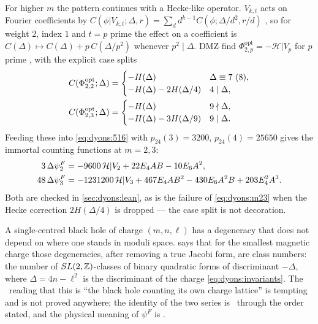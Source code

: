 For higher $m$ the pattern continues with a Hecke-like operator. $V_{k,t}$ acts on Fourier
coefficients by $C(\phi|V_{k,t};\Delta,r)=\sum_{d}d^{k-1}C(\phi;\Delta/d^2,r/d)$
, so for weight $2$, index $1$ and $t=p$ prime the effect on a
coefficient is $C(\Delta)\mapsto C(\Delta)+p\,C(\Delta/p^2)$ whenever $p^2\mid\Delta$. DMZ find
$\Phi^{\mathrm{opt}}_{2,p}=-\mathcal H|V_p$ for $p$ prime ,
with the explicit case splits
\begin{align}\label{eq:dyons:V2V3}
  C(\Phi^{\mathrm{opt}}_{2,2};\Delta)&=
  \begin{cases}-H(\Delta)&\Delta\equiv7\ (8),\\ -H(\Delta)-2H(\Delta/4)&4\mid\Delta,\end{cases}\notag\\
  C(\Phi^{\mathrm{opt}}_{2,3};\Delta)&=
  \begin{cases}-H(\Delta)&9\nmid\Delta,\\ -H(\Delta)-3H(\Delta/9)&9\mid\Delta.\end{cases}
\end{align}
Feeding these into \eqref{eq:dyons:516} with $p_{24}(3)=3200$, $p_{24}(4)=25650$ gives the
immortal counting functions at $m=2,3$:
\begin{align}\label{eq:dyons:m23}
  3\,\Delta\psi^F_2&=-9600\,\mathcal H|V_2+22E_4AB-10E_6A^2,\notag\\
  48\,\Delta\psi^F_3&=-1231200\,\mathcal H|V_3+467E_4AB^2-430E_6A^2B+203E_4^2A^3 .
\end{align}
Both are checked in \cref{sec:dyons:lean}, as is the failure of \eqref{eq:dyons:m23} when the
Hecke correction $2H(\Delta/4)$ is dropped --- the case split is not decoration.

\begin{physicsbox}
A single-centred black hole of charge $(m,n,\ell)$ has a degeneracy that does not depend on
where one stands in moduli space.  says that for the smallest magnetic
charge those degeneracies, after removing a true Jacobi form, are class numbers: the number of
$SL(2,\mathbb{Z})$-classes of binary quadratic forms of discriminant $-\Delta$, where $\Delta=4n-\ell^2$ is
the discriminant of the charge \eqref{eq:dyons:invariants}. The \TC\ reading that this is
``the black hole counting its own charge lattice'' is tempting and is not proved anywhere; the
identity of the two series is \TA\ through the order stated, and the physical meaning of
$\psi^F$ is \TL.
\end{physicsbox}

